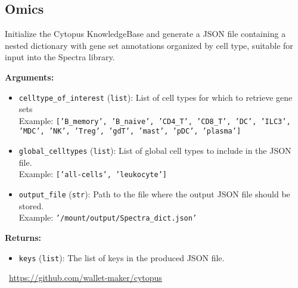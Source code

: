 \subsection{Omics}
\label{app:tasks:genomics_proteomics}
\begin{tcolorbox}[title={\texttt{cytopus\_db}}]
Initialize the Cytopus KnowledgeBase and generate a JSON file containing a nested dictionary with gene set annotations organized by cell type, suitable for input into the Spectra library.

\vspace{.5em}
\textbf{Arguments:}
\begin{itemize}[topsep=0pt,parsep=-1pt,partopsep=0pt]
\item \texttt{celltype\_of\_interest} (\texttt{list}): List of cell types for which to retrieve gene sets\\  Example: \texttt{['B\_memory', 'B\_naive', 'CD4\_T', 'CD8\_T', 'DC', 'ILC3', 'MDC', 'NK', 'Treg', 'gdT', 'mast', 'pDC', 'plasma']}
\item \texttt{global\_celltypes} (\texttt{list}): List of global cell types to include in the JSON file.\\  Example: \texttt{['all-cells', 'leukocyte']}
\item \texttt{output\_file} (\texttt{str}): Path to the file where the output JSON file should be stored.\\  Example: \texttt{'/mount/output/Spectra\_dict.json'}
\end{itemize}

\vspace{.5em}
\textbf{Returns:} \begin{itemize}[topsep=0pt,parsep=-1pt,partopsep=0pt]
\item \texttt{keys} (\texttt{list}): The list of keys in the produced JSON file.
\end{itemize}
\tcblower
\setlength{\hangindent}{\widthof{\faGithub~}}
\faGithub~\url{https://github.com/wallet-maker/cytopus}

\vspace{.5em}\setlength{\hangindent}{\widthof{\faFile*[regular]~}}\faFile*[regular]~


\end{tcolorbox}

